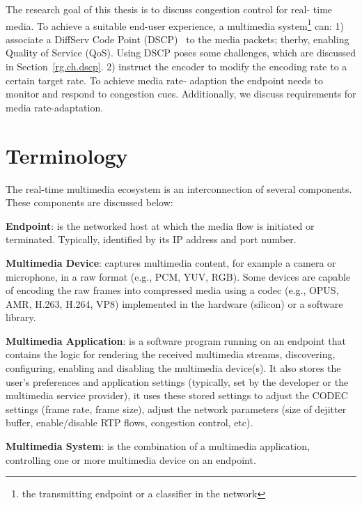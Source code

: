 
The research goal of this thesis is to discuss congestion control for real-
time media. To achieve a suitable end-user experience, a multimedia
system\footnote{the transmitting endpoint or a classifier in the network} can:
1) associate a DiffServ Code Point (DSCP)~\cite{rfc2474} to the media packets;
therby, enabling Quality of Service (QoS). Using DSCP poses some challenges,
which are discussed in Section~\ref{rg.ch.dscp}. 2) instruct the encoder to
modify the encoding rate to a certain target rate. To achieve media rate-
adaption the endpoint needs to monitor and respond to congestion cues.
Additionally, we  discuss requirements for media rate-adaptation.


\section{Terminology}

The real-time multimedia ecosystem is an interconnection of several
components. These components are discussed below:

\textbf{Endpoint}: is the networked host at which the media flow is initiated
or terminated. Typically, identified by its IP address and port number.


\textbf{Multimedia Device}: captures multimedia content, for example a camera
or microphone, in a raw format (e.g., PCM, YUV, RGB). Some devices are capable
of encoding the raw frames into compressed media using a codec (e.g., OPUS,
AMR, H.263, H.264, VP8) implemented in the hardware (silicon) or a software
library.


\textbf{Multimedia Application}: is a software program running on an endpoint
that contains the logic for rendering the received multimedia streams,
discovering, configuring, enabling and disabling the multimedia device(s). It
also stores the user's preferences and application settings (typically, set by
the developer or the multimedia service provider), it uses these stored
settings to adjust the CODEC settings (frame rate, frame size), adjust the
network parameters (size of dejitter buffer, enable/disable RTP flows,
congestion control, etc).

\textbf{Multimedia System}: is the combination of a multimedia application,
controlling one or more multimedia device on an endpoint.

